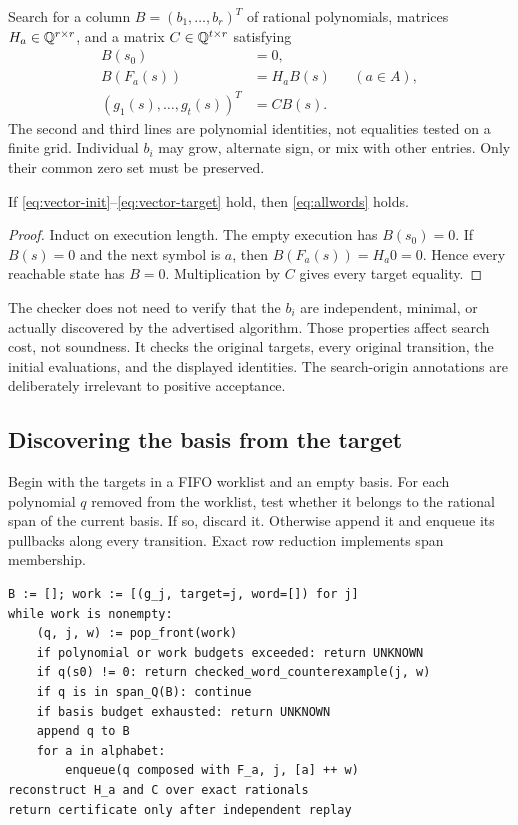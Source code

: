 Search for a column $B=(b_1,\ldots,b_r)^T$ of rational polynomials, matrices $H_a\in\mathbb Q^{r\times r}$, and a matrix $C\in\mathbb Q^{t\times r}$ satisfying
\begin{align}
 B(s_0)&=0, \label{eq:vector-init}\\
 B(F_a(s))&=H_a B(s) &&(a\in A),\label{eq:vector-step}\\
 (g_1(s),\ldots,g_t(s))^T&=C B(s).\label{eq:vector-target}
\end{align}
The second and third lines are polynomial identities, not equalities tested on a finite grid. Individual $b_i$ may grow, alternate sign, or mix with other entries. Only their common zero set must be preserved.

\begin{theorem}
If \eqref{eq:vector-init}--\eqref{eq:vector-target} hold, then \eqref{eq:allwords} holds.
\end{theorem}
\begin{proof}
Induct on execution length. The empty execution has $B(s_0)=0$. If $B(s)=0$ and the next symbol is $a$, then $B(F_a(s))=H_a0=0$. Hence every reachable state has $B=0$. Multiplication by $C$ gives every target equality.
\end{proof}

The checker does not need to verify that the $b_i$ are independent, minimal, or actually discovered by the advertised algorithm. Those properties affect search cost, not soundness. It checks the original targets, every original transition, the initial evaluations, and the displayed identities. The search-origin annotations are deliberately irrelevant to positive acceptance.

\subsection{Discovering the basis from the target}

Begin with the targets in a FIFO worklist and an empty basis. For each polynomial $q$ removed from the worklist, test whether it belongs to the rational span of the current basis. If so, discard it. Otherwise append it and enqueue its pullbacks along every transition. Exact row reduction implements span membership.

\begin{lstlisting}
B := []; work := [(g_j, target=j, word=[]) for j]
while work is nonempty:
    (q, j, w) := pop_front(work)
    if polynomial or work budgets exceeded: return UNKNOWN
    if q(s0) != 0: return checked_word_counterexample(j, w)
    if q is in span_Q(B): continue
    if basis budget exhausted: return UNKNOWN
    append q to B
    for a in alphabet:
        enqueue(q composed with F_a, j, [a] ++ w)
reconstruct H_a and C over exact rationals
return certificate only after independent replay
\end{lstlisting}

